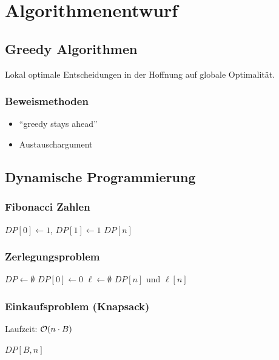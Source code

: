 \section*{Algorithmenentwurf}

\subsection*{Greedy Algorithmen}
Lokal optimale Entscheidungen in der Hoffnung auf globale Optimalität.

\subsubsection*{Beweismethoden}
\begin{itemize}
	\item \enquote{greedy stays ahead} 
	\item Austauschargument
\end{itemize}

\subsection*{Dynamische Programmierung}

\subsubsection*{Fibonacci Zahlen}
\begin{algorithm}[H]
	$DP[0] \gets 1$, $DP[1] \gets 1$\;
	\KwRet $DP[n]$\;
\end{algorithm}

\subsubsection*{Zerlegungsproblem}
\begin{algorithm}[H]
	$DP \gets \emptyset$\;
	$DP[0] \gets 0$\;
	$\ell \gets \emptyset$\;
	\KwRet $DP[n]$ und $\ell[n]$\;
\end{algorithm}

\subsubsection*{Einkaufsproblem (Knapsack)}
Laufzeit: $\mathcal{O}(n \cdot B)$

\begin{algorithm}[H]
	\KwRet $DP[B,n]$\;
\end{algorithm}
